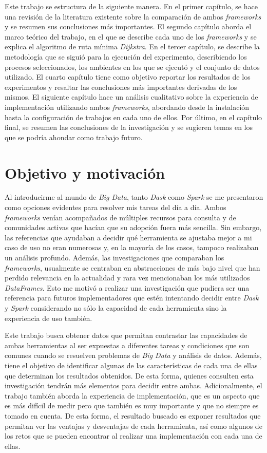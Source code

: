 Este trabajo se estructura de la siguiente manera. En el primer capítulo, se hace una revisión de la literatura existente sobre la comparación de ambos \textit{frameworks} y se resumen sus conclusiones más importantes. El segundo capítulo aborda el marco teórico del trabajo, en el que se describe cada uno de los \textit{frameworks} y se explica el algoritmo de ruta mínima \textit{Dijkstra}. En el tercer capítulo, se describe la metodología que se siguió para la ejecución del experimento, describiendo los procesos seleccionados, los ambientes en los que se ejecutó y el conjunto de datos utilizado. El cuarto capítulo tiene como objetivo reportar los resultados de los experimentos y resaltar las conclusiones más importantes derivadas de los mismos. El siguiente capítulo hace un análisis cualitativo sobre la experiencia de implementación utilizando ambos \textit{frameworks}, abordando desde la instalación hasta la configuración de trabajos en cada uno de ellos. Por último, en el capítulo final, se resumen las conclusiones de la investigación y se sugieren temas en los que se podría ahondar como trabajo futuro.

\section*{Objetivo y motivación}

\noindent Al introducirme al mundo de \textit{Big Data}, tanto \textit{Dask} como \textit{Spark} se me presentaron como opciones evidentes para resolver mis tareas del día a día. Ambos \textit{frameworks} venían acompañados de múltiples recursos para consulta y de comunidades activas que hacían que su adopción fuera más sencilla. Sin embargo, las referencias que ayudaban a decidir qué herramienta se ajustaba mejor a mi caso de uso no eran numerosas y, en la mayoría de los casos, tampoco realizaban un análisis profundo. Además, las investigaciones que comparaban los \textit{frameworks}, usualmente se centraban en abstracciones de más bajo nivel que han perdido relevancia en la actualidad y rara vez mencionaban los más utilizados \textit{DataFrames}. Esto me motivó a realizar una investigación que pudiera ser una referencia para futuros implementadores que estén intentando decidir entre \textit{Dask} y \textit{Spark} considerando no sólo la capacidad de cada herramienta sino la experiencia de uso también.

Este trabajo busca obtener datos que permitan contrastar las capacidades de ambas herramientas al ser expuestas a diferentes tareas y condiciones que son comunes cuando se resuelven problemas de \textit{Big Data} y análisis de datos. Además, tiene el objetivo de identificar algunas de las características de cada una de ellas que determinan los resultados obtenidos. De esta forma, quienes consulten esta investigación tendrán más elementos para decidir entre ambas. Adicionalmente, el trabajo también aborda la experiencia de implementación, que es un aspecto que es más difícil de medir pero que también es muy importante y que no siempre es tomado en cuenta. De esta forma, el resultado buscado es exponer resultados que permitan ver las ventajas y desventajas de cada herramienta, así como algunos de los retos que se pueden encontrar al realizar una implementación con cada una de ellas.

